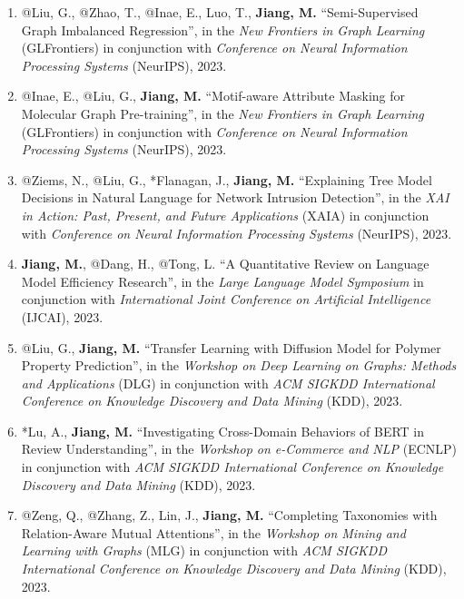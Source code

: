 \documentclass[10pt]{article}
\newenvironment{myindentpar}[1]%
{\begin{list}{}%
         {\setlength{\leftmargin}{#1}}%
         \item[]%
}
{\end{list}}
\newcounter{list}
\begin{document}
\begin{myindentpar}{0.00cm}
\begin{enumerate}[leftmargin=.5cm]
\item[W32] @Liu, G., @Zhao, T., @Inae, E., Luo, T., \textbf{Jiang, M.} ``Semi-Supervised Graph Imbalanced Regression'', in the \textit{New Frontiers in Graph Learning} (GLFrontiers) in conjunction with \textit{Conference on Neural Information Processing Systems} (NeurIPS), 2023.

\item[W31] @Inae, E., @Liu, G., \textbf{Jiang, M.} ``Motif-aware Attribute Masking for Molecular Graph Pre-training'', in the \textit{New Frontiers in Graph Learning} (GLFrontiers) in conjunction with \textit{Conference on Neural Information Processing Systems} (NeurIPS), 2023.

\item[W30] @Ziems, N., @Liu, G., *Flanagan, J., \textbf{Jiang, M.} ``Explaining Tree Model Decisions in Natural Language for Network Intrusion Detection'', in the \textit{XAI in Action: Past, Present, and Future Applications} (XAIA) in conjunction with \textit{Conference on Neural Information Processing Systems} (NeurIPS), 2023.

\item[W29] \textbf{Jiang, M.}, @Dang, H., @Tong, L. ``A Quantitative Review on Language Model Efficiency Research'', in the \textit{Large Language Model Symposium} in conjunction with \textit{International Joint Conference on Artificial Intelligence} (IJCAI), 2023.

\item[W28] @Liu, G., \textbf{Jiang, M.} ``Transfer Learning with Diffusion Model for Polymer Property Prediction'', in the \textit{Workshop on Deep Learning on Graphs: Methods and Applications} (DLG) in conjunction with \textit{ACM SIGKDD International Conference on Knowledge Discovery and Data Mining} (KDD), 2023.

\item[W27] *Lu, A., \textbf{Jiang, M.} ``Investigating Cross-Domain Behaviors of BERT in Review Understanding'', in the \textit{Workshop on e-Commerce and NLP} (ECNLP) in conjunction with \textit{ACM SIGKDD International Conference on Knowledge Discovery and Data Mining} (KDD), 2023.

\item[W26] @Zeng, Q., @Zhang, Z., Lin, J., \textbf{Jiang, M.} ``Completing Taxonomies with Relation-Aware Mutual Attentions'', in the \textit{Workshop on Mining and Learning with Graphs} (MLG) in conjunction with \textit{ACM SIGKDD International Conference on Knowledge Discovery and Data Mining} (KDD), 2023.


\end{enumerate}
\end{myindentpar}
\end{document}
